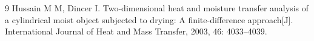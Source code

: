 \begin{thebibliography}{9}
 Hussain M M, Dincer I. Two-dimensional heat and moisture transfer analysis of a cylindrical moist object subjected to drying: A finite-difference approach[J]. International Journal of Heat and Mass Transfer, 2003, 46: 4033--4039.
\end{thebibliography}

